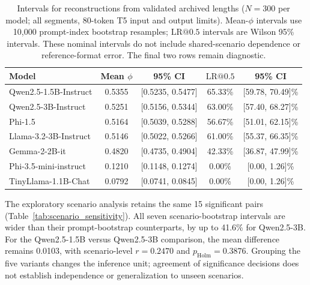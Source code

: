 \documentclass[electronics,article,submit,pdftex,moreauthors]{Definitions/mdpi}
\begin{document}
\begin{table}[ht]
\centering
\caption{Intervals for reconstructions from validated archived lengths ($N=300$ per model; all segments, 80-token T5 input and output limits). Mean-$\phi$ intervals use 10,000 prompt-index bootstrap resamples; $\mathrm{LR}@0.5$ intervals are Wilson 95\% intervals. These nominal intervals do not include shared-scenario dependence or reference-format error. The final two rows remain diagnostic.}
\label{tab:statistical_results}
\begin{tabular}{l c c c c}
\toprule
Model & Mean $\phi$ & 95\% CI & $\mathrm{LR}@0.5$ & 95\% CI \\
\midrule
Qwen2.5-1.5B-Instruct & 0.5355 & [0.5235, 0.5477] & 65.33\% & [59.78, 70.49]\% \\
Qwen2.5-3B-Instruct & 0.5251 & [0.5156, 0.5344] & 63.00\% & [57.40, 68.27]\% \\
Phi-1.5 & 0.5164 & [0.5039, 0.5288] & 56.67\% & [51.01, 62.15]\% \\
Llama-3.2-3B-Instruct & 0.5146 & [0.5022, 0.5266] & 61.00\% & [55.37, 66.35]\% \\
Gemma-2-2B-it & 0.4820 & [0.4735, 0.4904] & 42.33\% & [36.87, 47.99]\% \\
Phi-3.5-mini-instruct & 0.1210 & [0.1148, 0.1274] & 0.00\% & [0.00, 1.26]\% \\
TinyLlama-1.1B-Chat & 0.0792 & [0.0741, 0.0845] & 0.00\% & [0.00, 1.26]\% \\
\bottomrule
\end{tabular}
\end{table}

The exploratory scenario analysis retains the same 15 significant pairs (Table~\ref{tab:scenario_sensitivity}). All seven scenario-bootstrap intervals are wider than their prompt-bootstrap counterparts, by up to 41.6\% for Qwen2.5-3B. For the Qwen2.5-1.5B versus Qwen2.5-3B comparison, the mean difference remains 0.0103, with scenario-level $r=0.2470$ and $p_{\mathrm{Holm}}=0.3876$. Grouping the five variants changes the inference unit; agreement of significance decisions does not establish independence or generalization to unseen scenarios.
\end{document}

